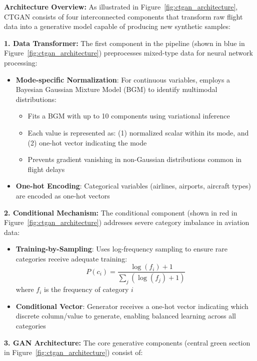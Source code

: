 \documentclass[conference]{IEEEtran}
\begin{document}
\textbf{Architecture Overview:} As illustrated in Figure~\ref{fig:ctgan_architecture}, CTGAN consists of four interconnected components that transform raw flight data into a generative model capable of producing new synthetic samples:

\textbf{1. Data Transformer:} The first component in the pipeline (shown in blue in Figure~\ref{fig:ctgan_architecture}) preprocesses mixed-type data for neural network processing:
\begin{itemize}
    \item \textbf{Mode-specific Normalization}: For continuous variables, employs a Bayesian Gaussian Mixture Model (BGM) to identify multimodal distributions:
    \begin{itemize}
        \item Fits a BGM with up to 10 components using variational inference
        \item Each value is represented as: (1) normalized scalar within its mode, and (2) one-hot vector indicating the mode
        \item Prevents gradient vanishing in non-Gaussian distributions common in flight delays
    \end{itemize}
    \item \textbf{One-hot Encoding}: Categorical variables (airlines, airports, aircraft types) are encoded as one-hot vectors
\end{itemize}

\textbf{2. Conditional Mechanism:} The conditional component (shown in red in Figure~\ref{fig:ctgan_architecture}) addresses severe category imbalance in aviation data:
\begin{itemize}
    \item \textbf{Training-by-Sampling}: Uses log-frequency sampling to ensure rare categories receive adequate training:
    \begin{equation}
    P(c_i) = \frac{\log(f_i) + 1}{\sum_j (\log(f_j) + 1)}
    \end{equation}
    where $f_i$ is the frequency of category $i$
    \item \textbf{Conditional Vector}: Generator receives a one-hot vector indicating which discrete column/value to generate, enabling balanced learning across all categories
\end{itemize}

\textbf{3. GAN Architecture:} The core generative components (central green section in Figure~\ref{fig:ctgan_architecture}) consist of:
\end{document}
